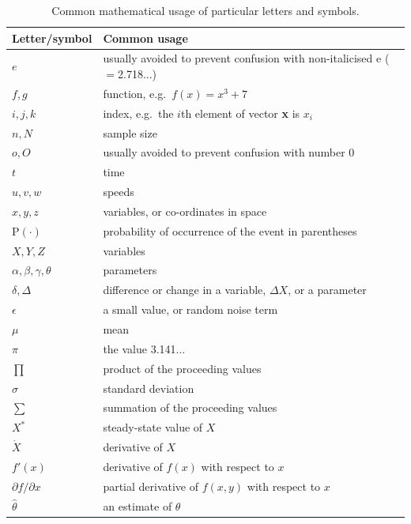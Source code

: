 \begin{table}
  \caption{Common mathematical usage of particular letters and
      symbols. \label{tab:letters}}
  \centering
  \begin{tabular}{ll}
\hline
Letter/symbol & Common usage\\
\hline
$e$ & usually avoided to prevent confusion with non-italicised e ($=$2.718...)\\
$f, g$ & function, e.g.~$f(x) = x^3 + 7$\\
$i, j, k$ & index, e.g.~the $i$th element of vector {\bf x} is $x_i$\\
$n, N$ & sample size\\
$o, O$ & usually avoided to prevent confusion with number 0\\
$t$ & time\\
$u, v, w$ & speeds\\
$x, y, z$ & variables, or co-ordinates in space\\
\mbox{P}$(\cdot)$ & probability of occurrence of the event in parentheses\\
$X, Y, Z$ & variables\\
$\alpha, \beta, \gamma, \theta$ & parameters\\
$\delta, \Delta$ & difference or change in a variable, $\Delta X$, or a
  parameter\\
$\epsilon$ & a small value, or random noise term\\
$\mu$ & mean\\
$\pi$ & the value 3.141...\\
$\prod$ & product of the proceeding values\\
$\sigma$ & standard deviation\\
$\sum$ & summation of the proceeding values\\
$X^*$ & steady-state value of $X$\\
$\dot{X}$ & derivative of $X$\\  %
$f'(x)$ & derivative of $f(x)$ with respect to $x$\\
$\partial f/\partial x$ & partial derivative of $f(x,y)$ with respect to $x$\\
$\hat{\theta}$ & an estimate of $\theta$\\
\hline
\end{tabular}
\end{table}


\begin{frame}
\frametitle{}
\bi
  \item
\ei
\end{frame}

